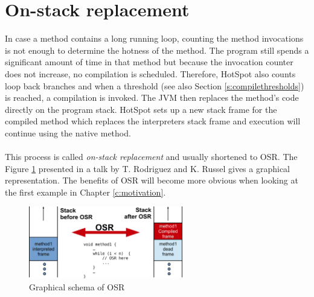 \section{On-stack replacement}
\label{s:onstackreplacement}
In case a method contains a long running loop, counting the method invocations is not enough to determine the hotness of the method. The program still spends a significant amount of time in that method but because the invocation counter does not increase, no compilation is scheduled.
Therefore, HotSpot also counts loop back branches and when a threshold (see also Section \ref{s:compilethresholds}) is reached, a compilation is invoked. The JVM then replaces the method's code directly on the program stack. HotSpot sets up a new stack frame for the compiled method which replaces the interpreters stack frame and execution will continue using the native method.
\\\\
This process is called \textit{on-stack replacement} and usually shortened to OSR. The Figure \ref{f:osr} presented in a talk by T. Rodriguez and K. Russel \cite{client_compiler_talk} gives a graphical representation.
The benefits of OSR will become more obvious when looking at the first example in Chapter \ref{c:motivation}.
\begin{figure}[ht]
  \begin{center}
    \centering
    \includegraphics[width=0.6\textwidth]{figures/osr.png}
    \caption{Graphical schema of OSR}
    \label{f:osr}
  \end{center}
\end{figure}
